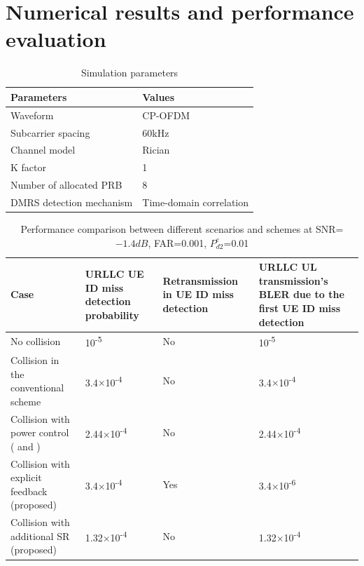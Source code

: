 \documentclass[conference]{IEEEtran}
\begin{document}
\section{Numerical results and performance evaluation}\label{III}


\begin{table}[htbp]
\caption{Simulation parameters}
\begin{center}
\begin{tabular}{|p{8em}|p{8em}|}
 \hline
 \textbf{Parameters} & \textbf{Values}\\
 \hline
 Waveform & CP-OFDM\\
 \hline
 Subcarrier spacing & 60kHz\\
 \hline
 Channel model & Rician\\
 \hline
 K factor & 1\\
 \hline
 Number of allocated PRB & 8\\
 \hline
 DMRS detection mechanism & Time-domain correlation\\
 

 
 \hline
\end{tabular}
\label{tab1}
\end{center}
\vspace{-4mm}
\end{table}

\begin{table}[htbp]
\caption{Performance comparison between different scenarios and schemes at SNR=$-1.4dB$, FAR=0.001, $P^{e}_{d2}$=0.01}
\begin{center}
\begin{tabular}{|p{19em}|p{9em}|p{10em}|p{12em}|}
 \hline
 \textbf{Case} & \textbf{URLLC UE ID miss detection probability}& \textbf{Retransmission in UE ID miss detection}& \textbf{URLLC UL transmission's BLER due to the first UE ID miss detection}\\
 \hline
 No collision  & 10\textsuperscript{-5}&No&10\textsuperscript{-5}\\
 \hline
 Collision in the conventional scheme& 3.4$\times$10\textsuperscript{-4}&No&3.4$\times$10\textsuperscript{-4}\\
 \hline
 Collision with power control (\cite{b2} and \cite{b3})&2.44$\times$10\textsuperscript{-4}&No&2.44$\times$10\textsuperscript{-4}\\
 \hline
 Collision with explicit feedback (proposed)& 3.4$\times$10\textsuperscript{-4}&Yes&3.4$\times$10\textsuperscript{-6}\\
\hline
 Collision with additional SR (proposed)& 1.32$\times$10\textsuperscript{-4}&No&1.32$\times$10\textsuperscript{-4}\\

 
 \hline
\end{tabular}
\label{tab2}
\end{center}
\vspace{-6mm}
\end{table}
\end{document}
